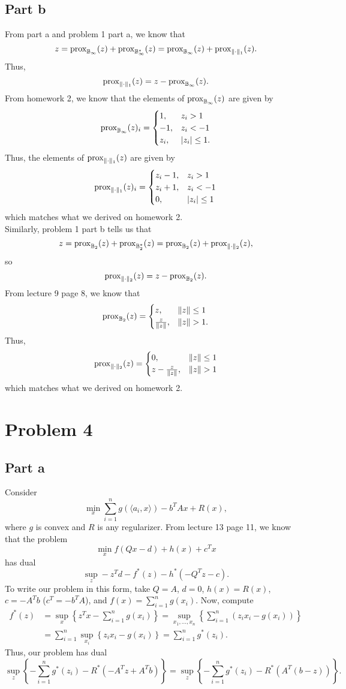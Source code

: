 \documentclass{article}
\begin{document}
\subsection{Part b}
From part a and problem 1 part a, we know that
\[
z=\operatorname{prox}_{\mathbb{B}_{\infty}}(z)+\operatorname{prox}_{\mathbb{B}_{\infty}^*}(z)=\operatorname{prox}_{\mathbb{B}_{\infty}}(z)+\operatorname{prox}_{\|\cdot\|_1}(z).
\]
Thus,
\[
\operatorname{prox}_{\|\cdot\|_1}(z)=z-\operatorname{prox}_{\mathbb{B}_{\infty}}(z).
\]
From homework 2, we know that the elements of $\operatorname{prox}_{\mathbb{B}_{\infty}}(z)$ are given by
\[
\operatorname{prox}_{\mathbb{B}_{\infty}}(z)_i=\begin{cases}
1, &z_i>1\\
-1, &z_i<-1\\
z_i, &|z_i|\leq 1.
\end{cases}
\]
Thus, the elements of $\operatorname{prox}_{\|\cdot\|_1}(z)$ are given by
\[
\operatorname{prox}_{\|\cdot\|_1}(z)_i=\begin{cases}
z_i-1, &z_i>1\\
z_i+1, &z_i<-1\\
0, &|z_i|\leq 1
\end{cases}
\]
which matches what we derived on homework 2.\\
Similarly, problem 1 part b tells us that
\[
z=\operatorname{prox}_{\mathbb{B}_{2}}(z)+\operatorname{prox}_{\mathbb{B}_{2}^*}(z)=\operatorname{prox}_{\mathbb{B}_{2}}(z)+\operatorname{prox}_{\|\cdot\|_2}(z),
\]
so 
\[
\operatorname{prox}_{\|\cdot\|_2}(z)=z-\operatorname{prox}_{\mathbb{B}_{2}}(z).
\]
From lecture 9 page 8, we know that 
\[
\prox_{\mathbb{B}_{2}}(z)=\begin{cases}
z, &\|z\|\leq1\\
\frac{z}{\|z\|}, &\|z\|>1.\end{cases}
\]
Thus,
\[
\prox_{\|\cdot\|_2}(z)=\begin{cases}
0, &\|z\|\leq1\\
z-\frac{z}{\|z\|}, &\|z\|>1\end{cases}
\]
which matches what we derived on homework 2. 

\section{Problem 4}
\subsection{Part a}
Consider 
\[
\min_{x} \sum_{i=1}^n g(\langle a_i, x\rangle) - b^TAx + R(x),
\]
where $g$ is convex and $R$ is any regularizer. From lecture 13 page 11, we know that the problem
\[
\min_{x} f(Qx-d)+h(x)+c^Tx
\]
has dual
\[
\sup_z -z^Td-f^*(z)-h^*(-Q^Tz-c).
\]
To write our problem in this form, take $Q=A$, $d=0$, $h(x)=R(x)$, $c=-A^Tb$ ($c^T=-b^TA$), and $f(x)=\sum_{i=1}^n g(x_i)$.
Now, compute
\begin{align*}
f^*(z)&=\sup_x \left\{ z^Tx - \sum_{i=1}^n g(x_i)\right\}=\sup_{x_1,\ldots,x_n} \left\{\sum_{i=1}^n (z_ix_i-g(x_i))\right\}\\&=
\sum_{i=1}^n\sup_{x_i} \left\{z_ix_i-g(x_i)\right\}=\sum_{i=1}^ng^*(z_i).
\end{align*}
Thus, our problem has dual
\[
\sup_z \left\{-\sum_{i=1}^ng^*(z_i)-R^*(-A^Tz+A^Tb)\right\}=\sup_z \left\{-\sum_{i=1}^ng^*(z_i)-R^*(A^T(b-z))\right\}.
\]
\end{document}
